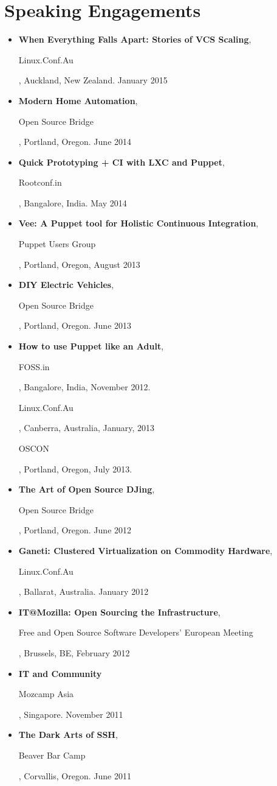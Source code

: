 \documentclass[a4paper,12pt]{report}
\begin{document}
\section*{Speaking Engagements}
\begin{itemize} \itemsep -0.25em
\item \textbf{When Everything Falls Apart: Stories of VCS Scaling}, \begin{it}Linux.Conf.Au\end{it}, Auckland, New Zealand. January 2015
\item \textbf{Modern Home Automation}, \begin{it}Open Source Bridge\end{it}, Portland, Oregon. June 2014
\item \textbf{Quick Prototyping + CI with LXC and Puppet}, \begin{it}Rootconf.in\end{it}, Bangalore, India. May 2014
\item \textbf{Vee: A Puppet tool for Holistic Continuous Integration}, \begin{it}Puppet Users Group\end{it}, Portland, Oregon, August 2013
\item \textbf{DIY Electric Vehicles}, \begin{it}Open Source Bridge\end{it}, Portland, Oregon. June 2013
\item \textbf{How to use Puppet like an Adult}, \begin{it}FOSS.in\end{it}, Bangalore, India, November 2012. \begin{it}Linux.Conf.Au\end{it}, Canberra, Australia, January, 2013 \begin{it}OSCON\end{it}, Portland, Oregon, July 2013.
\item \textbf{The Art of Open Source DJing}, \begin{it}Open Source Bridge\end{it}, Portland, Oregon. June 2012
\item \textbf{Ganeti: Clustered Virtualization on Commodity Hardware}, \begin{it}Linux.Conf.Au\end{it}, Ballarat, Australia. January 2012
\item \textbf{IT@Mozilla: Open Sourcing the Infrastructure}, \begin{it}Free and Open Source Software Developers' European Meeting\end{it}, Brussels, BE, February 2012
\item \textbf{IT and Community} \begin{it}Mozcamp Asia\end{it}, Singapore. November 2011
\item \textbf{The Dark Arts of SSH}, \begin{it}Beaver Bar Camp\end{it}, Corvallis, Oregon. June 2011
\end{itemize}
\end{document}

